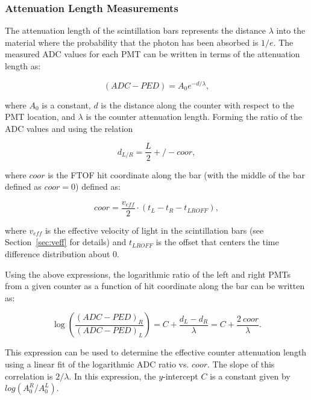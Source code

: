 \documentclass{elsart}
\begin{document}

\subsubsection{Attenuation Length Measurements}
\label{sec:attlen}

The attenuation length of the scintillation bars represents the distance $\lambda$ into the material
where the probability that the photon has been absorbed is $1/e$. The measured ADC values for each
PMT can be written in terms of the attenuation length as:

\begin{equation}
\label{al-adc}
(ADC - PED) = A_0 e^{-d/\lambda},
\end{equation}

\noindent
where $A_0$ is a constant, $d$ is the distance along the counter with respect to the PMT location, and
$\lambda$ is the counter attenuation length. Forming the ratio of the ADC values and using the relation

\begin{equation}
  d_{L/R} = \frac{L}{2} +/- coor,
\end{equation}

\noindent
where $coor$ is the FTOF hit coordinate along the bar (with the middle of the bar defined as $coor=0$)
defined as:

\begin{equation}
\label{coor}
coor = \frac{v_{eff}}{2} \cdot (t_L - t_R - t_{LROFF}),
\end{equation}

\noindent
where $v_{eff}$ is the effective velocity of light in the scintillation bars (see Section~\ref{sec:veff} for
details) and $t_{LROFF}$ is the offset that centers the time difference distribution about 0.

Using the above expressions, the logarithmic ratio of the left and right PMTs from a given counter as a function
of hit coordinate along the bar can be written as:

\begin{equation}
\label{linear}
\log \left( \frac{(ADC-PED)_R}{(ADC-PED)_L} \right ) = C + \frac{d_L - d_R}{\lambda} = C + \frac{2~coor}{\lambda}.
\end{equation}

\noindent
This expression can be used to determine the effective counter attenuation length using a linear fit of the
logarithmic ADC ratio vs. $coor$. The slope of this correlation is $2/\lambda$. In this expression, the
$y$-intercept $C$ is a constant given by $log(A_0^R/A_0^L)$.
\end{document}
